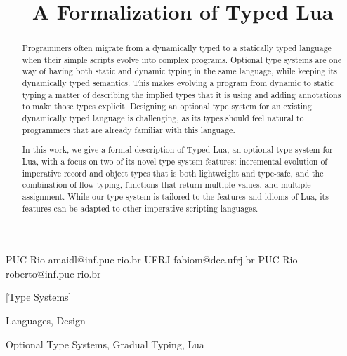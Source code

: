 \documentclass[preprint]{sigplanconf}
\begin{document}
\setlength{\pdfpageheight}{\paperheight}
\setlength{\pdfpagewidth}{\paperwidth}



\title{A Formalization of Typed Lua}

           {PUC-Rio}
           {amaidl@inf.puc-rio.br}
           {UFRJ}
           {fabiom@dcc.ufrj.br}
           {PUC-Rio}
           {roberto@inf.puc-rio.br}

\maketitle

\begin{abstract}
Programmers often migrate from a dynamically typed
to a statically typed language when their simple scripts
evolve into complex programs. Optional type systems are
one way of having both static and dynamic typing
in the same language, while keeping its dynamically typed
semantics. This makes evolving a program from dynamic to
static typing a matter of describing the implied types that
it is using and adding annotations to make those types explicit.
Designing an optional type system for
an existing dynamically typed language is challenging, as its types should feel natural to programmers that are already familiar with
this language.

In this work, we give a formal description of Typed Lua, an
optional type system for Lua, with a focus on two of its novel type system features: incremental evolution of imperative record and object types that is both lightweight and type-safe, and
the combination of flow typing, functions that return multiple values, and multiple assignment. While our type system is tailored to the features and idioms of Lua, its features can be adapted to other imperative scripting languages.
\end{abstract}

[Type Systems]

\terms
Languages, Design

\keywords
Optional Type Systems, Gradual Typing, Lua
\end{document}
